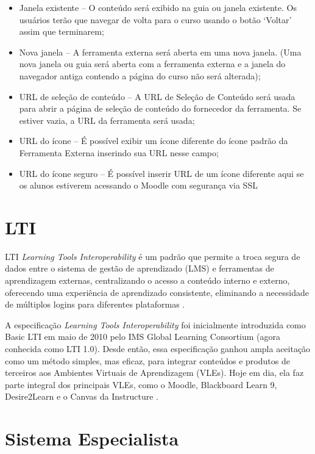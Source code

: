 \begin{itemize}
    \item Janela existente – O conteúdo será exibido na guia ou janela existente. Os usuários terão que navegar de volta para o curso usando o botão ‘Voltar’ assim que terminarem;
    \item Nova janela – A ferramenta externa será aberta em uma nova janela. (Uma nova janela ou guia será aberta com a ferramenta externa e a janela do navegador antiga contendo a página do curso não será alterada);
    \item URL de seleção de conteúdo – A URL de Seleção de Conteúdo será usada para abrir a página de seleção de conteúdo do fornecedor da ferramenta. Se estiver vazia, a URL da ferramenta será usada;
    \item URL do ícone – É possível exibir um ícone diferente do ícone padrão da Ferramenta Externa inserindo sua URL nesse campo;
    \item URL do ícone seguro – É possível inserir URL de um ícone diferente aqui se os alunos estiverem acessando o Moodle com segurança via SSL
\end{itemize}

\section{LTI}

LTI \textit{Learning Tools Interoperability} é um padrão que permite a troca segura de dados entre o sistema de gestão de aprendizado (LMS) e ferramentas de aprendizagem externas, centralizando o acesso a conteúdo interno e externo, oferecendo uma experiência de aprendizado consistente, eliminando a necessidade de múltiplos logins para diferentes plataformas \cite{verdaguer}.

A especificação \textit{Learning Tools Interoperability} foi inicialmente introduzida como Basic LTI em maio de 2010 pelo IMS Global Learning Consortium (agora conhecida como LTI 1.0). Desde então, essa especificação ganhou ampla aceitação como um método simples, mas eficaz, para integrar conteúdos e produtos de terceiros aos Ambientes Virtuais de Aprendizagem (VLEs). Hoje em dia, ela faz parte integral dos principais VLEs, como o Moodle, Blackboard Learn 9, Desire2Learn e o Canvas da Instructure \cite[p.4]{vickers}.

\section{Sistema Especialista}

